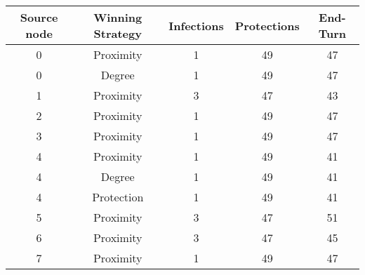 \documentclass[results.tex]{subfiles}
\begin{document}
    \begin{center}
        \begin{tabular}{| c || c | c | c | c |}
            \hline
            {\bfseries Source node} & {\bfseries Winning Strategy} & {\bfseries Infections} & {\bfseries Protections}
            & {\bfseries End-Turn}
            \\  %
            \hline\hline
            0                       & Proximity                    & 1                      & 49                      & 47                   \\
            \hline
            0                       & Degree                       & 1                      & 49                      & 47                   \\
            \hline
            1                       & Proximity                    & 3                      & 47                      & 43                   \\
            \hline
            2                       & Proximity                    & 1                      & 49                      & 47                   \\
            \hline
            3                       & Proximity                    & 1                      & 49                      & 47                   \\
            \hline
            4                       & Proximity                    & 1                      & 49                      & 41                   \\
            \hline
            4                       & Degree                       & 1                      & 49                      & 41                   \\
            \hline
            4                       & Protection                   & 1                      & 49                      & 41                   \\
            \hline
            5                       & Proximity                    & 3                      & 47                      & 51                   \\
            \hline
            6                       & Proximity                    & 3                      & 47                      & 45                   \\
            \hline
            7                       & Proximity                    & 1                      & 49                      & 47                   \\

\end{tabular}
\end{center}
\end{document}
